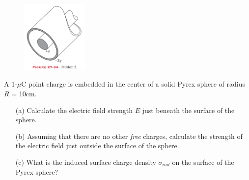 \documentclass[11pt,letterpaper,boxed]{pset}
\begin{document}
    \begin{figure} [ht]
        \includegraphics[width=125px]{HW2Images/P27-5.png}
        \label{fig:P27-5}
    \end{figure}
    \newpage
    
    \begin{problem} [E29.29]
    	A 1-$\mu$C point charge is embedded in the center of a solid Pyrex sphere of radius $R$ = 10cm.
    	
    	\begin{itemize}
    	    \item [(a)] Calculate the electric field strength $E$ just beneath the surface of the sphere.
    	    \item [(b)] Assuming that there are no other \textit{free} charges, calculate the strength of the electric field just outside the surface of the sphere.
    	    \item [(c)] What is the induced surface charge density $\sigma_{ind}$ on the surface of the Pyrex sphere?
    	\end{itemize}
    \end{problem}
    \newpage
\end{document}
